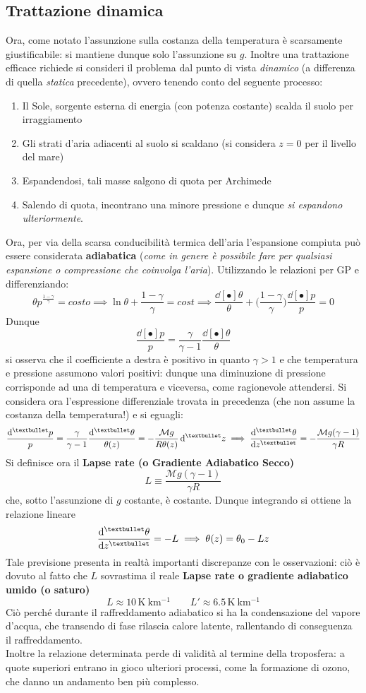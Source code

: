 \documentclass[10pt, oneside]{book}
\newcommand{\kelvin}[1]{\, \mathrm{K^{#1}}}
\newcommand{\molms}{\mathcal{M}}
\newcommand{\meters}[2]{\, \mathrm{#1 m^{#2}}}
\begin{document}
\subsection{Trattazione dinamica}
Ora, come notato l'assunzione sulla costanza della temperatura è scarsamente giustificabile: si mantiene dunque solo l'assunzione su $g$. Inoltre una trattazione efficace richiede si consideri il problema dal punto di vista \textit{dinamico} (a differenza di quella \textit{statica} precedente), ovvero tenendo conto del seguente processo:
\begin{enumerate}
\item Il Sole, sorgente esterna di energia (con potenza costante) scalda il suolo per irraggiamento
\item Gli strati d'aria adiacenti al suolo si scaldano (si considera $z=0$ per il livello del mare)
\item Espandendosi, tali masse salgono di quota per Archimede
\item Salendo di quota, incontrano una minore pressione e dunque \textit{si espandono ulteriormente}.
\end{enumerate}
Ora, per via della scarsa conducibilità termica dell'aria l'espansione compiuta può essere considerata \textbf{adiabatica} (\textit{come in genere è possibile fare per qualsiasi espansione o compressione che coinvolga l'aria}).
Utilizzando le relazioni per GP e differenziando:
\[\theta p^{\frac{1-\gamma}{\gamma}} = costo \implies \ln \theta + \frac{1-\gamma}{\gamma} = cost \implies \frac{\dd[•]{\theta}}{\theta} + \bigg(\frac{1-\gamma}{\gamma}\bigg)\frac{\dd[•]{p}}{p} = 0\]
Dunque
\[\frac{\dd[•]{p}}{p} = \frac{\gamma}{\gamma - 1}\frac{\dd[•]{\theta}}{\theta}\]
si osserva che il coefficiente a destra è positivo in quanto $\gamma > 1$ e che temperatura e pressione assumono valori positivi: dunque una diminuzione di pressione corrisponde ad una di temperatura e viceversa, come ragionevole attendersi. Si considera ora l'espressione differenziale trovata in precedenza (che non assume la costanza della temperatura!) e si eguagli:
\[\frac{\dd[•]{p}}{p} = \frac{\gamma}{\gamma - 1}\frac{\dd[•]{\theta}}{\theta(z)} = - \frac{\molms g}{R \theta(z)} \dd[•]{z} \implies \dv[•]{\theta}{z} = - \frac{\molms g (\gamma - 1)}{\gamma R}\]
Si definisce ora il \textbf{Lapse rate (o Gradiente Adiabatico Secco)}
\[L \equiv \frac{\molms g (\gamma - 1)}{\gamma R}\]
che, sotto l'assunzione di $g$ costante, è costante. Dunque integrando si ottiene la relazione lineare
\[\dv[•]{\theta}{z} = - L \implies \theta(z) = \theta_0 - Lz\]
Tale previsione presenta in realtà importanti discrepanze con le osservazioni: ciò è dovuto al fatto che $L$ sovrastima il reale \textbf{Lapse rate o gradiente adiabatico umido (o saturo)}
\[L \approx 10 \kelvin{} \meters{k}{-1} \qquad L' \approx 6.5 \kelvin{} \meters{k}{-1}\]
Ciò perché durante il raffreddamento adiabatico si ha la condensazione del vapore d'acqua, che transendo di fase rilascia calore latente, rallentando di conseguenza il raffreddamento.\\
Inoltre la relazione determinata perde di validità al termine della troposfera: a quote superiori entrano in gioco ulteriori processi, come la formazione di ozono, che danno un andamento ben più complesso.
\end{document}
